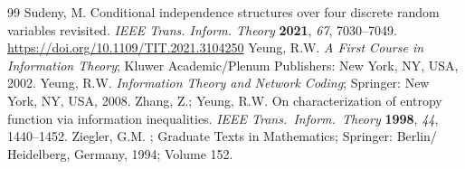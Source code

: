 \documentclass[reqno]{amsart}
\theoremstyle{definition}
\begin{document}
\begin{thebibliography}{99}
%
 Sudeny, M. 
   Conditional independence structures over four discrete random variables
   revisited.
   \emph{IEEE Trans. Inform. Theory} \textbf{2021}, \emph{67},  7030--7049.
   \url{https://doi.org/10.1109/TIT.2021.3104250}
%
 Yeung, R.W. 
   \emph{A First Course in Information Theory};
   Kluwer Academic/Plenum Publishers: New York, NY, USA, 2002.
%
 Yeung, R.W.
   \emph{Information Theory and Network Coding};
   Springer: New York, NY, USA, 2008.
%
 Zhang, Z.; Yeung, R.W. 
   On characterization of entropy function via information inequalities.
   \emph{IEEE Trans.\ Inform.\ Theory} \textbf{1998}, {\emph{44}}, 1440--1452.
%
 Ziegler, G.M. 
  ;
  \newblock Graduate Texts in Mathematics;  Springer:  Berlin/\allowbreak 
  Heidelberg, Germany,
  1994; Volume 152.
%
\end{thebibliography}
\end{document}
